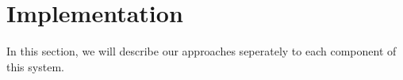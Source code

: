 \section{Implementation}
\label{sec:implementation}

In this section, we will describe our approaches seperately to each component of this system. 






